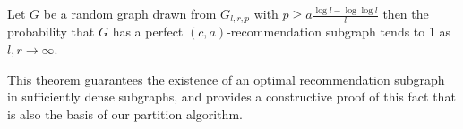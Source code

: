 \begin{thm}\label{perfect}
Let $G$ be a random graph drawn from $G_{l, r, p}$ with $p\geq a\frac{\log l-\log\log
l}{l}$ then the probability that $G$ has a perfect $(c, a)$-recommendation
subgraph tends to 1 as $l,r\to\infty$.
\end{thm}

This theorem guarantees the existence of an optimal recommendation subgraph in sufficiently dense subgraphs, and provides a constructive proof of this fact that is also the basis of our partition algorithm. \vs

%
%
%
%
